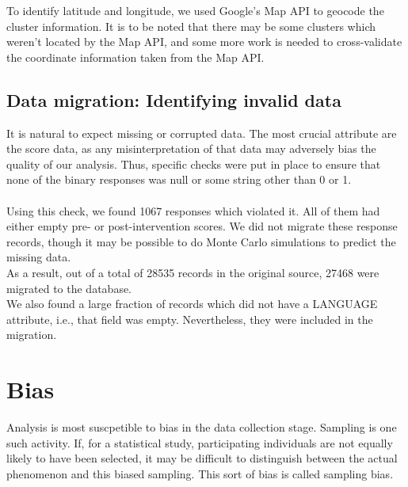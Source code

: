 \documentclass[10pt]{article}
\begin{document}
To identify latitude and longitude, we used Google's Map API to geocode the cluster information. It is to be noted that there may be some clusters which weren't located by the Map API, and some more work is needed to cross-validate the coordinate information taken from the Map API.

\subsection{Data migration: Identifying invalid data}
It is natural to expect missing or corrupted data. The most crucial attribute are the score data, as any misinterpretation of that data may adversely bias the quality of our analysis. Thus, specific checks were put in place to ensure that none of the binary responses was null or some string other than 0 or 1.\\\\
Using this check, we found 1067 responses which violated it. All of them had either empty pre- or post-intervention scores. We did not migrate these response records, though it may be possible to do Monte Carlo simulations to predict the missing data.\\
As a result, out of a total of 28535 records in the original source, 27468 were migrated to the database.\\
We also found a large fraction of records which did not have a LANGUAGE attribute, i.e., that field was empty. Nevertheless, they were included in the migration.

\newpage
\section{Bias}
Analysis is most suscpetible to bias in the data collection stage. Sampling is one such activity. If, for a statistical study, participating individuals are not equally likely to have been selected, it may be difficult to distinguish between the actual phenomenon and this biased sampling.
This sort of bias is called sampling bias.

\newpage
\end{document}

